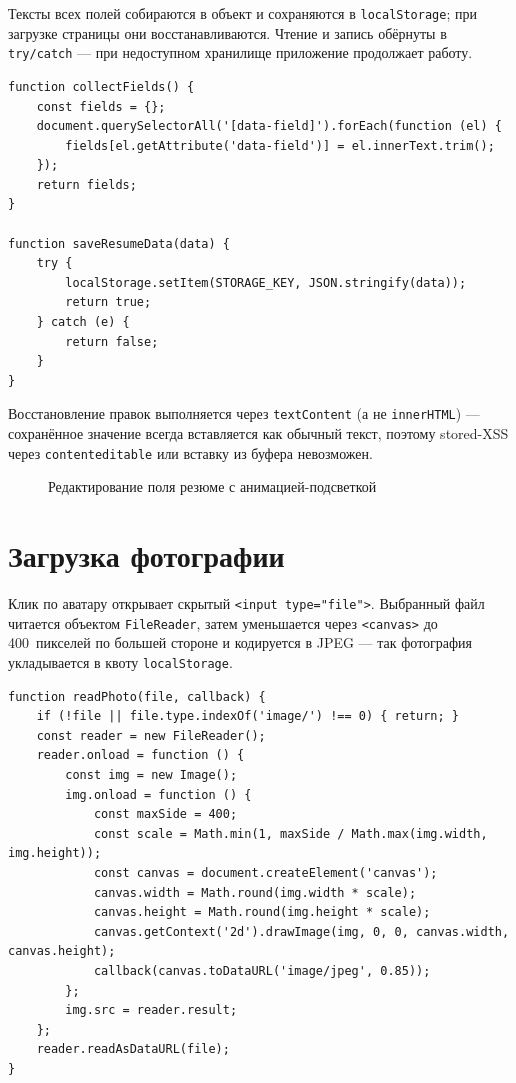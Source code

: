 Тексты всех полей собираются в объект и сохраняются в \texttt{localStorage};
при загрузке страницы они восстанавливаются. Чтение и запись обёрнуты в
\texttt{try/catch} --- при недоступном хранилище приложение продолжает
работу.

\begin{lstlisting}[caption={Сбор полей и сохранение (\texttt{resume.js})},captionpos=b]
function collectFields() {
    const fields = {};
    document.querySelectorAll('[data-field]').forEach(function (el) {
        fields[el.getAttribute('data-field')] = el.innerText.trim();
    });
    return fields;
}

function saveResumeData(data) {
    try {
        localStorage.setItem(STORAGE_KEY, JSON.stringify(data));
        return true;
    } catch (e) {
        return false;
    }
}
\end{lstlisting}

Восстановление правок выполняется через \texttt{textContent} (а не
\texttt{innerHTML}) --- сохранённое значение всегда вставляется как обычный
текст, поэтому stored-XSS через \texttt{contenteditable} или вставку из
буфера невозможен.

\begin{figure}[h]
  \centering
  \caption{Редактирование поля резюме с анимацией-подсветкой}
  \label{fig:editing}
\end{figure}

\section{Загрузка фотографии}

Клик по аватару открывает скрытый \texttt{<input type="file">}. Выбранный
файл читается объектом \texttt{FileReader}, затем уменьшается через
\texttt{<canvas>} до 400~пикселей по большей стороне и кодируется в JPEG ---
так фотография укладывается в квоту \texttt{localStorage}.

\begin{lstlisting}[caption={Чтение и сжатие фотографии (\texttt{resume.js})},captionpos=b]
function readPhoto(file, callback) {
    if (!file || file.type.indexOf('image/') !== 0) { return; }
    const reader = new FileReader();
    reader.onload = function () {
        const img = new Image();
        img.onload = function () {
            const maxSide = 400;
            const scale = Math.min(1, maxSide / Math.max(img.width, img.height));
            const canvas = document.createElement('canvas');
            canvas.width = Math.round(img.width * scale);
            canvas.height = Math.round(img.height * scale);
            canvas.getContext('2d').drawImage(img, 0, 0, canvas.width, canvas.height);
            callback(canvas.toDataURL('image/jpeg', 0.85));
        };
        img.src = reader.result;
    };
    reader.readAsDataURL(file);
}
\end{lstlisting}

